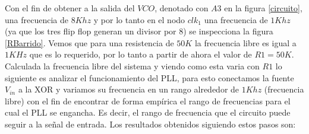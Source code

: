 \documentclass[10pt,a4paper]{IEEEtran}
\begin{document}
Con el fin de obtener a la salida del $VCO$, denotado con $A3$ en la figura \ref{circuito}, una frecuencia de $8Khz$ y por lo tanto en el nodo 
$clk_1$ una frecuencia de $1Khz$ (ya que los tres flip flop generan un divisor por 8) se inspecciona la figura \ref{RBarrido}. Vemos que para 
una resistencia de $50K$ la frecuencia libre es igual a $1KHz$ que es lo requerido, por lo tanto a partir de ahora el valor de $R1=50K$.\\
Calculada la frecuencia libre del sistema y viendo como esta varia con $R1$ lo siguiente es analizar el funcionamiento del PLL, para esto conectamos 
la fuente $V_{in}$ a la XOR y variamos su frecuencia en un rango alrededor de $1Khz$ (frecuencia libre) con el fin de encontrar de forma empírica el rango
de frecuencias para el cual el PLL se engancha. Es decir, el rango de frecuencia que el circuito puede seguir a la señal de entrada. Los resultados obtenidos siguiendo estos 
pasos son:
\end{document}
